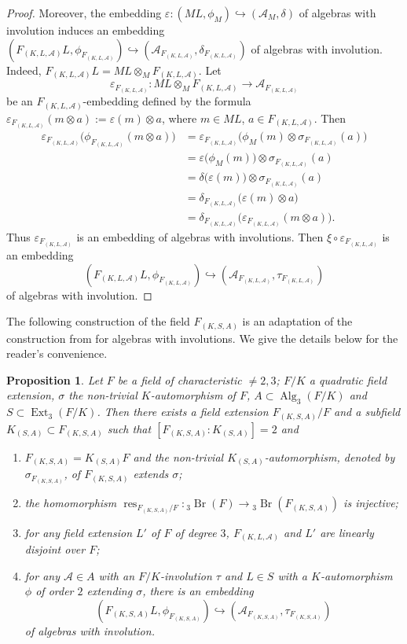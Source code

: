 \documentclass[10pt]{article}
\newtheorem{proposition}[theorem]{Proposition}
\theoremstyle{definition}
\DeclareMathOperator{\Br}{Br}
\DeclareMathOperator{\res}{res}
\DeclareMathOperator{\Alg}{Alg}
\DeclareMathOperator{\Ext}{Ext}
\newcommand{\A}{\mathcal A}
\newcommand{\Fk}{F_{(K,L,\A)}}
\newcommand{\Fs}{F_{(K,S,A)}}
\newcommand{\Ks}{K_{(S,A)}}
\newcommand{\bthree}[1]{{}_3\Br(#1)}
\newcommand{\sourcepage}[1]{\label{source-page-#1}}
\begin{document}
\begin{proof}
Moreover, the embedding $\varepsilon:(ML,\phi_M)\hookrightarrow(\A_M,\delta)$ of algebras with involution induces an embedding $(\Fk L,\phi_{\Fk})\hookrightarrow(\A_{\Fk},\delta_{\Fk})$ of algebras with involution. Indeed, $\Fk L=ML\otimes_M\Fk$. Let
\[
\varepsilon_{\Fk}:ML\otimes_M\Fk\longrightarrow\A_{\Fk}
\]
be an $\Fk$-embedding defined by the formula $\varepsilon_{\Fk}(m\otimes a):=\varepsilon(m)\otimes a$, where $m\in ML$, $a\in\Fk$. Then
\begin{align*}
\varepsilon_{\Fk}\bigl(\phi_{\Fk}(m\otimes a)\bigr)
 &=\varepsilon_{\Fk}\bigl(\phi_M(m)\otimes\sigma_{\Fk}(a)\bigr)\\
 &=\varepsilon\bigl(\phi_M(m)\bigr)\otimes\sigma_{\Fk}(a)\\
 &=\delta\bigl(\varepsilon(m)\bigr)\otimes\sigma_{\Fk}(a)\\
 &=\delta_{\Fk}\bigl(\varepsilon(m)\otimes a\bigr)\\
 &=\delta_{\Fk}\bigl(\varepsilon_{\Fk}(m\otimes a)\bigr).
\end{align*}
Thus $\varepsilon_{\Fk}$ is an embedding of algebras with involutions. Then $\xi\circ\varepsilon_{\Fk}$ is an embedding
\[
(\Fk L,\phi_{\Fk})\hookrightarrow(\A_{\Fk},\tau_{\Fk})
\]
of algebras with involution.
\end{proof}
The following construction of the field $\Fs$ is an adaptation of the construction from \cite{r10} for algebras with involutions. We give the details below for the reader's convenience.
\newpage
\sourcepage{7}
\begin{proposition}\label{prop-transfinite}
Let $F$ be a field of characteristic $\neq2,3$; $F/K$ a quadratic field extension, $\sigma$ the non-trivial $K$-automorphism of $F$, $A\subset\Alg_3(F/K)$ and $S\subset\Ext_3(F/K)$. Then there exists a field extension $\Fs/F$ and a subfield $\Ks\subset\Fs$ such that $[\Fs:\Ks]=2$ and
\begin{enumerate}
\item $\Fs=\Ks F$ and the non-trivial $\Ks$-automorphism, denoted by $\sigma_{\Fs}$, of $\Fs$ extends $\sigma$;
\item the homomorphism $\res_{\Fs/F}:\bthree F\to\bthree{\Fs}$ is injective;
\item for any field extension $L'$ of $F$ of degree $3$, $\Fk$ and $L'$ are linearly disjoint over $F$;
\item for any $\A\in A$ with an $F/K$-involution $\tau$ and $L\in S$ with a $K$-automorphism $\phi$ of order $2$ extending $\sigma$, there is an embedding
\[
(\Fs L,\phi_{\Fs})\hookrightarrow(\A_{\Fs},\tau_{\Fs})
\]
of algebras with involution.
\end{enumerate}
\end{proposition}
\end{document}
